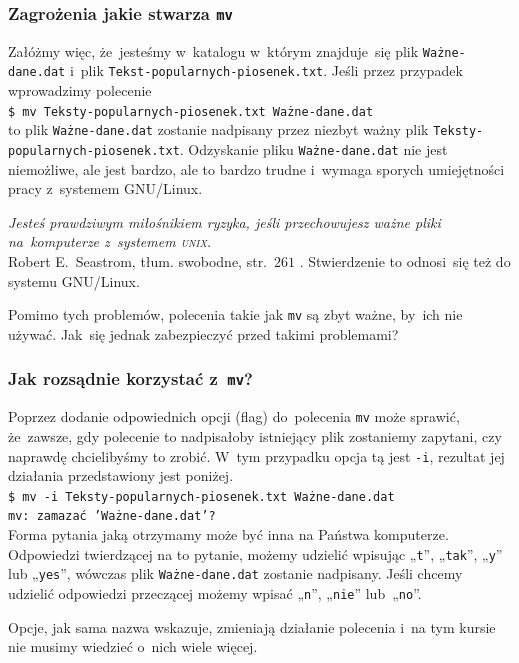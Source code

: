 \documentclass[10pt,t]{beamer}
\begin{document}
\begin{frame}
  \frametitle{Zagrożenia jakie stwarza \texttt{mv}}


  Załóżmy więc, że~jesteśmy w~katalogu w~którym znajduje~się plik
  \texttt{Ważne-dane.dat} i~plik \texttt{Tekst-popularnych-piosenek.txt}.
  Jeśli przez przypadek wprowadzimy polecenie \\
  \texttt{\$ mv Teksty-popularnych-piosenek.txt Ważne-dane.dat} \\
  to plik \texttt{Ważne-dane.dat} zostanie nadpisany przez niezbyt ważny
  plik \texttt{Teksty-popularnych-piosenek.txt}. Odzyskanie pliku
  \texttt{Ważne-dane.dat} nie jest niemożliwe, ale jest bardzo, ale to
  \alert{bardzo} trudne i~wymaga sporych umiejętności pracy z~systemem
  GNU/Linux.

  \textit{Jesteś prawdziwym miłośnikiem ryzyka, jeśli przechowujesz ważne
    pliki na~komputerze z~systemem \textsc{unix}.} \\
  Robert E.~Seastrom, tłum. swobodne, str.~$261$
  \parencite{Garfinkel-Weise-Strassmann-The-UNIX-HATERS-Handbook-Pub-1994}.
  Stwierdzenie to odnosi~się też do systemu GNU/Linux.

  Pomimo tych problemów, polecenia takie jak \texttt{mv} są zbyt ważne,
  by~ich nie używać. Jak~się jednak zabezpieczyć przed takimi problemami?

\end{frame}





\begin{frame}
  \frametitle{Jak rozsądnie korzystać z~\texttt{mv}?}


  Poprzez dodanie odpowiednich opcji (flag) do~polecenia \texttt{mv}
  może sprawić, że~zawsze, gdy polecenie to nadpisałoby istniejący
  plik zostaniemy zapytani, czy naprawdę chcielibyśmy to zrobić.
  W~tym przypadku opcja tą jest \texttt{-i}, rezultat jej działania
  przedstawiony jest poniżej. \\
  \texttt{\$ mv -i Teksty-popularnych-piosenek.txt Ważne-dane.dat} \\
  \texttt{mv: zamazać 'Ważne-dane.dat'?} \\
  Forma pytania jaką otrzymamy może być inna na Państwa komputerze.
  Odpowiedzi twierdzącej na to pytanie, możemy udzielić wpisując
  „\texttt{t}”, „\texttt{tak}”, „\texttt{y}” lub „\texttt{yes}”, wówczas
  plik \texttt{Ważne-dane.dat} zostanie nadpisany. Jeśli chcemy udzielić
  odpowiedzi przeczącej możemy wpisać „\texttt{n}”, „\texttt{nie}”
  lub~„\texttt{no}”.

  Opcje, jak sama nazwa wskazuje, zmieniają działanie polecenia i~na tym
  kursie nie musimy wiedzieć o~nich wiele więcej.

\end{frame}
\end{document}
